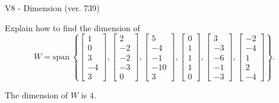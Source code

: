 \begin{exercise}
  \begin{exerciseTitle}V8 - Dimension (ver. 739)\end{exerciseTitle}
  \begin{exerciseStatement}
    Explain how to find the dimension of 
\[W=\mathrm{span}\ \left\{\left[\begin{array}{r}
1 \\
0 \\
3 \\
-4 \\
3
\end{array}\right] , \left[\begin{array}{r}
2 \\
-2 \\
-2 \\
-3 \\
0
\end{array}\right] , \left[\begin{array}{r}
5 \\
-4 \\
-1 \\
-10 \\
3
\end{array}\right] , \left[\begin{array}{r}
0 \\
1 \\
1 \\
1 \\
0
\end{array}\right] , \left[\begin{array}{r}
3 \\
-3 \\
-6 \\
-1 \\
-3
\end{array}\right] , \left[\begin{array}{r}
-2 \\
-4 \\
1 \\
2 \\
-4
\end{array}\right]\right\}.\]



  \end{exerciseStatement}
  \begin{exerciseAnswer}
   The dimension of \(W\) is  \(4\).
  


  \end{exerciseAnswer}
\end{exercise}